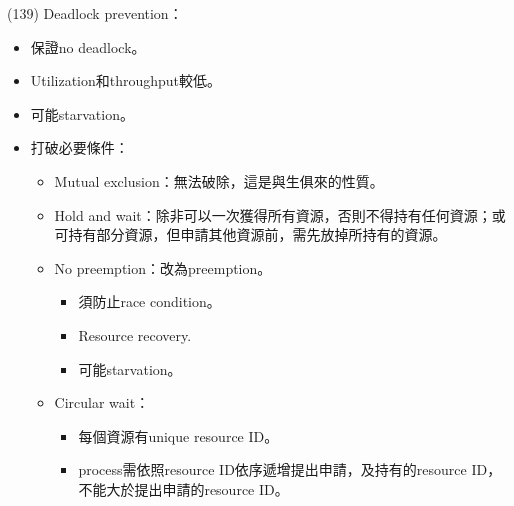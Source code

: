\begin{theorem}{(139)} Deadlock prevention：\begin{itemize}
        \item 保證no deadlock。
        \item Utilization和throughput較低。
        \item 可能starvation。
        \item 打破必要條件：\begin{itemize}
            \item Mutual exclusion：無法破除，這是與生俱來的性質。
            \item Hold and wait：除非可以一次獲得所有資源，否則不得持有任何資源；或可持有部分資源，但申請其他資源前，需先放掉所持有的資源。
            \item No preemption：改為preemption。\begin{itemize}
                \item 須防止race condition。
                \item Resource recovery.
                \item 可能starvation。
            \end{itemize}
            \item Circular wait：\begin{itemize}
                \item 每個資源有unique resource ID。
                \item process需依照resource ID依序遞增提出申請，及持有的resource ID，不能大於提出申請的resource ID。
            \end{itemize}
        \end{itemize}
    \end{itemize}
\end{theorem}

